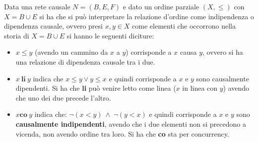 \begin{definizione}
    Data una rete causale $N = (B,E, F)$ e dato un ordine parziale $(X, \leq)$ con $X = B \cup E$ si ha che si può interpretare la relazione d'ordine come indipendenza o dipendenza causale, ovvero presi $x, y \in X$ come elementi che occorrono nella storia di $X = B \cup E$ si hanno le seguenti diciture:
    \begin{itemize}
        \item $x \leq y$ (avendo un cammino da $x$ a $y$) corrisponde a $x$ causa $y$, ovvero si ha una relazione di dipendenza causale tra i due.
        \item $x \ \textbf{li} \ y$ indica che $x \leq y \lor y \leq x$ e quindi corrisponde a $x$ e $y$ sono causalmente dipendenti. Si ha che \textbf{li} può venire letto come linea ($x$ in linea con $y$) avendo che uno dei due precede l'altro.
        \item $x \textbf{co} \ y$ indica che: $\lnot(x < y)\  \land  \ \lnot (y < x)$ e quindi corrisponde a $x$ e $y$ sono \textbf{causalmente indipendenti}, avendo che i due elementi non si precedono a vicenda, non avendo ordine tra loro. Si ha che \textbf{co} sta per concurrency.
    \end{itemize}
\end{definizione}
